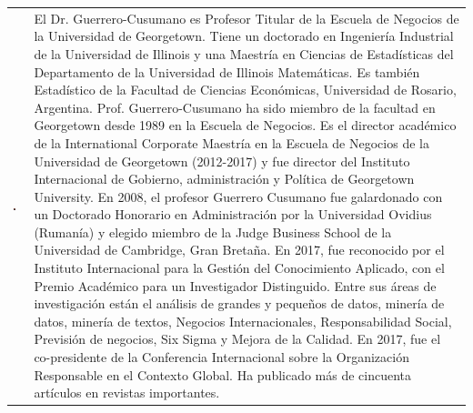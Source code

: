 \begin{table}[H]
\centering
\begin{tabular}{m{}  m{}}
\begin{center} 
\includegraphics[width=0.2\textwidth]{./fotos/cusumano} \end{center} & 
\noindent \small{El Dr. Guerrero-Cusumano es Profesor Titular de la Escuela de Negocios de la Universidad de Georgetown. Tiene un doctorado en Ingeniería Industrial de la Universidad de Illinois y una Maestría en Ciencias de Estadísticas del Departamento de la Universidad de Illinois Matemáticas. Es también
Estadístico de la Facultad de Ciencias Económicas, Universidad de Rosario, Argentina. Prof. Guerrero-Cusumano ha sido miembro de la facultad en Georgetown
desde 1989 en la Escuela de Negocios. Es el director académico de la International Corporate Maestría en la Escuela de Negocios de la Universidad de Georgetown (2012-2017) y fue director del Instituto Internacional de Gobierno, administración y Política de Georgetown University. En 2008, el profesor Guerrero Cusumano fue galardonado con un Doctorado Honorario en Administración por la Universidad Ovidius (Rumanía) y elegido miembro de la Judge Business School de la Universidad de Cambridge, Gran Bretaña. En 2017, fue reconocido por el Instituto Internacional para la Gestión del Conocimiento Aplicado, con el Premio Académico para un Investigador Distinguido. Entre sus áreas de investigación están el análisis de grandes y pequeños de datos, minería de datos, minería de textos, Negocios Internacionales, Responsabilidad Social, Previsión de negocios, Six Sigma y Mejora de la Calidad. En 2017, fue el co-presidente de la Conferencia Internacional sobre la Organización Responsable en el Contexto Global. Ha publicado más de cincuenta artículos en revistas importantes.} \\
\end{tabular}
\end{table}




